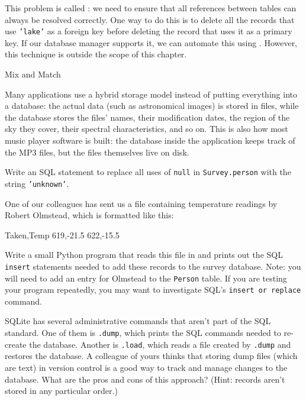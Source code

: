 This problem is called : we need to ensure that all references between tables can
always be resolved correctly. One way to do this is to delete all the
records that use \texttt{'lake'} as a foreign key before deleting the
record that uses it as a primary key. If our database manager supports
it, we can automate this using . However, this technique is outside the scope of this chapter.

\begin{swcbox}{Mix and Match}

Many applications use a hybrid storage model instead of putting
everything into a database: the actual data (such as astronomical
images) is stored in files, while the database stores the files' names,
their modification dates, the region of the sky they cover, their
spectral characteristics, and so on. This is also how most music player
software is built: the database inside the application keeps track of
the MP3 files, but the files themselves live on disk.

\end{swcbox}

\begin{challenge}
  Write an SQL statement to replace all uses of \texttt{null} in
  \texttt{Survey.person} with the string \texttt{'unknown'}.
\end{challenge}

\begin{challenge}
  One of our colleagues has sent us a  file
  containing temperature readings by Robert Olmstead, which is formatted
  like this:

\begin{VerbFile}
Taken,Temp
619,-21.5
622,-15.5
\end{VerbFile}

  Write a small Python program that reads this file in and prints out
  the SQL \texttt{insert} statements needed to add these records to the
  survey database. Note: you will need to add an entry for Olmstead to
  the \texttt{Person} table. If you are testing your program repeatedly,
  you may want to investigate SQL's \texttt{insert or replace} command.
\end{challenge}

\begin{challenge}
  SQLite has several administrative commands that aren't part of the SQL
  standard. One of them is \texttt{.dump}, which prints the SQL commands
  needed to re-create the database. Another is \texttt{.load}, which
  reads a file created by \texttt{.dump} and restores the database. A
  colleague of yours thinks that storing dump files (which are text) in
  version control is a good way to track and manage changes to the
  database. What are the pros and cons of this approach? (Hint: records
  aren't stored in any particular order.)
\end{challenge}

